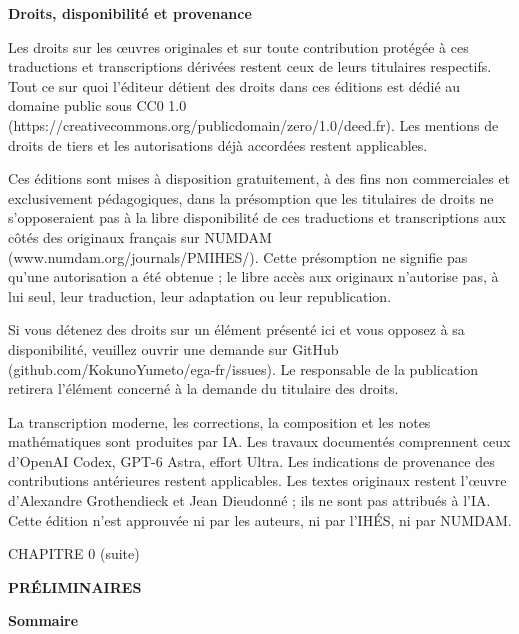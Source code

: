 \documentclass[10pt,oneside]{book}
\newcommand{\oldpage}[2][]{%
  \setcounter{footnote}{0}%
  \marginpar{\scriptsize\textbf{#1}~|~#2}\ignorespaces}
\begin{document}
\clearpage
\begingroup
\small
\noindent\textbf{Droits, disponibilité et provenance}

Les droits sur les œuvres originales et sur toute contribution protégée à ces traductions et transcriptions dérivées restent ceux de leurs titulaires respectifs. Tout ce sur quoi l'éditeur détient des droits dans ces éditions est dédié au domaine public sous CC0 1.0 (https://creativecommons.org/publicdomain/zero/1.0/deed.fr). Les mentions de droits de tiers et les autorisations déjà accordées restent applicables.

Ces éditions sont mises à disposition gratuitement, à des fins non commerciales et exclusivement pédagogiques, dans la présomption que les titulaires de droits ne s'opposeraient pas à la libre disponibilité de ces traductions et transcriptions aux côtés des originaux français sur NUMDAM (www.numdam.org/journals/PMIHES/). Cette présomption ne signifie pas qu'une autorisation a été obtenue ; le libre accès aux originaux n'autorise pas, à lui seul, leur traduction, leur adaptation ou leur republication.

Si vous détenez des droits sur un élément présenté ici et vous opposez à sa disponibilité, veuillez ouvrir une demande sur GitHub (github.com/KokunoYumeto/ega-fr/issues). Le responsable de la publication retirera l'élément concerné à la demande du titulaire des droits.

La transcription moderne, les corrections, la composition et les notes mathématiques sont produites par IA. Les travaux documentés comprennent ceux d'OpenAI Codex, GPT-6 Astra, effort Ultra. Les indications de provenance des contributions antérieures restent applicables. Les textes originaux restent l'œuvre d'Alexandre Grothendieck et Jean Dieudonné ; ils ne sont pas attribués à l'IA. Cette édition n'est approuvée ni par les auteurs, ni par l'IHÉS, ni par NUMDAM.
\par
\endgroup
\clearpage

%
\clearpage
\thispagestyle{plain}
\oldpage[IV-1]{5}
\label{chapter:0IV1-fr}

\begin{center}
{\large CHAPITRE 0 (suite)\footnotemark\par}
\vspace{1.5em}
{\Large\bfseries PRÉLIMINAIRES\par}
\vspace{2em}
{\large\bfseries Sommaire\par}
\end{center}
\end{document}
